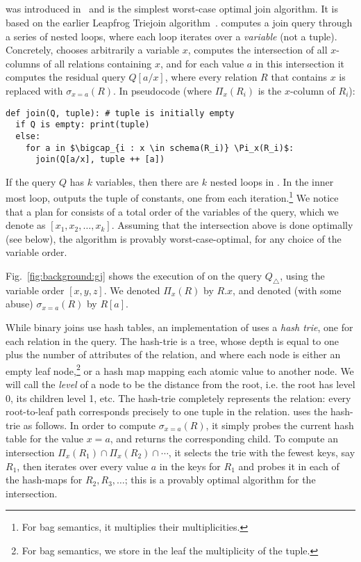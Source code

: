 \subsection{\GJ}\label{sec:background:gj}

\GJ was introduced in~\cite{DBLP:journals/sigmod/NgoRR13} and is the
simplest worst-case optimal join algorithm.  It is based on the
earlier Leapfrog Triejoin algorithm~\cite{DBLP:conf/icdt/Veldhuizen14}.
%
\GJ computes a join query through a series of nested
loops, where each loop iterates over a {\em variable} (not a tuple).
Concretely, \GJ chooses arbitrarily a variable $x$, computes the
intersection of all $x$-columns of all relations containing $x$, and
for each value $a$ in this intersection it computes the residual query
$Q[a/x]$, where every relation $R$ that contains $x$ is replaced with
$\sigma_{x=a}(R)$.  In pseudocode (where $\Pi_x (R_i)$ is the $x$-column of $R_i$):
%
\begin{lstlisting}[basicstyle=\ttfamily]
def join(Q, tuple): # tuple is initially empty
  if Q is empty: print(tuple)
  else:
    for a in $\bigcap_{i : x \in schema(R_i)} \Pi_x(R_i)$:
      join(Q[a/x], tuple ++ [a])
\end{lstlisting}
%
If the query $Q$ has $k$ variables, then there are $k$ nested loops in
\GJ.  In the inner most loop, \GJ outputs the tuple of constants, one
from each iteration.\footnote{For bag semantics, it multiplies their
  multiplicities.}  We notice that a plan for \GJ consists of a total
order of the variables of the query, which we denote as
$[x_1, x_2, \ldots, x_k]$.  Assuming that the intersection above is
done optimally (see below), the algorithm is provably
worst-case-optimal, for any choice of the variable order.

\begin{example}
  Fig.~\ref{fig:background:gj} shows the execution of \GJ on the
  query $Q_\triangle$, using the variable order $[x,y,z]$.  We denoted
  $\Pi_x(R)$ by $R.x$, and denoted (with some abuse) $\sigma_{x=a}(R)$
  by $R[a]$.
\end{example}


While binary joins use hash tables, an implementation of \GJ uses a
\emph{hash trie}, one for each relation in the query.  The hash-trie
is a tree, whose depth is equal to one plus the number of attributes
of the relation, and where each node is either an empty leaf
node,\footnote{For bag semantics, we store in the leaf the
  multiplicity of the tuple.} or a hash map mapping each atomic value
to another node.  We will call the \emph{level} of a node to be the
distance from the root, i.e. the root has level 0, its children level
1, etc.  The hash-trie completely represents the relation: every
root-to-leaf path corresponds precisely to one tuple in the relation.
\GJ uses the hash-trie as follows.  In order to compute
$\sigma_{x=a}(R)$, it simply probes the current hash table for the
value $x=a$, and returns the corresponding child.  To compute an
intersection $\Pi_x(R_1) \cap \Pi_x(R_2) \cap \cdots$, it selects the
trie with the fewest keys, say $R_1$, then iterates over every value
$a$ in the keys for $R_1$ and probes it in each of the hash-maps for
$R_2, R_3, \ldots$; this is a provably optimal algorithm for the
intersection.

